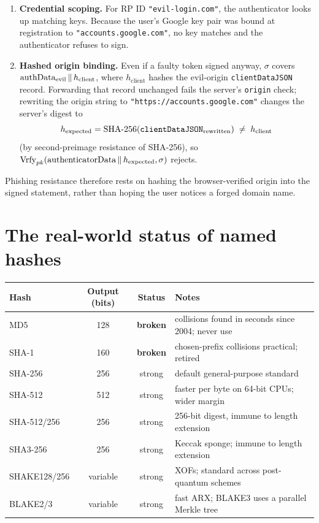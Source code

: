 \begin{enumerate}
  \item \textbf{Credential scoping.} For RP ID \texttt{"evil-login.com"}, the authenticator looks up matching keys. Because the user's Google key pair was bound at registration to \texttt{"accounts.google.com"}, no key matches and the authenticator refuses to sign.
  \item \textbf{Hashed origin binding.} Even if a faulty token signed anyway, $\sigma$ covers $\text{authData}_{\text{evil}} \,\|\, h_{\text{client}}$, where $h_{\text{client}}$ hashes the evil-origin \texttt{clientDataJSON} record. Forwarding that record unchanged fails the server's \texttt{origin} check; rewriting the origin string to \texttt{"https://accounts.google.com"} changes the server's digest to
  \[
    h_{\text{expected}} = \text{SHA-256}(\text{\texttt{clientDataJSON}}_{\text{rewritten}}) \;\ne\; h_{\text{client}}
  \]
  (by second-preimage resistance of SHA-256), so $\operatorname{Vrfy}_{pk}(\text{authenticatorData} \,\|\, h_{\text{expected}}, \sigma)$ rejects.
\end{enumerate}

Phishing resistance therefore rests on hashing the browser-verified origin into the signed statement, rather than hoping the user notices a forged domain name.

\section{The real-world status of named hashes}
\label{ch14:realworld}

\begin{center}
\begin{tabular}{lccl}
\toprule
Hash & Output (bits) & Status & Notes \\
\midrule
MD5          & 128      & \textbf{broken} & collisions found in seconds since 2004; never use \\
SHA-1        & 160      & \textbf{broken} & chosen-prefix collisions practical; retired \\
SHA-256      & 256      & strong          & default general-purpose standard \\
SHA-512      & 512      & strong          & faster per byte on 64-bit CPUs; wider margin \\
SHA-512/256  & 256      & strong          & 256-bit digest, immune to length extension \\
SHA3-256     & 256      & strong          & Keccak sponge; immune to length extension \\
SHAKE128/256 & variable & strong          & XOFs; standard across post-quantum schemes \\
BLAKE2/3     & variable & strong          & fast ARX; BLAKE3 uses a parallel Merkle tree \\
\bottomrule
\end{tabular}
\end{center}

